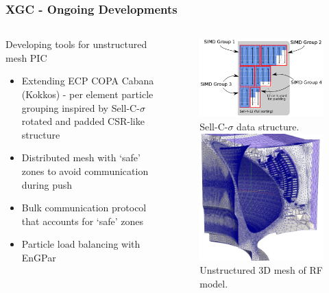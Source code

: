 \documentclass[aspectratio=169]{beamer}
\begin{document}
\begin{frame}
  \frametitle{XGC - Ongoing Developments}
  \begin{columns}
    \begin{column}{0.5\textwidth}
      Developing tools for unstructured mesh PIC
      \begin{itemize}
        \item Extending ECP COPA Cabana (Kokkos) - per element particle grouping
          inspired by Sell-C-$\sigma$ rotated and padded CSR-like structure
        \item Distributed mesh with `safe' zones to avoid communication during
          push
        \item Bulk communication protocol that accounts for `safe' zones
        \item Particle load balancing with EnGPar
      \end{itemize}
    \end{column}
    \begin{column}{0.5\textwidth}
      \begin{figure}
        \centering
        \includegraphics[width=.6\textwidth]{figures/sellCSigma.png}\\
        \small{Sell-C-$\sigma$ data structure.} \smallskip \\
        \includegraphics[width=.4\textwidth]{figures/rfMesh.png}\\
        \small{Unstructured 3D mesh of RF model.}
      \end{figure}
    \end{column}
  \end{columns}
\end{frame}
\end{document}
